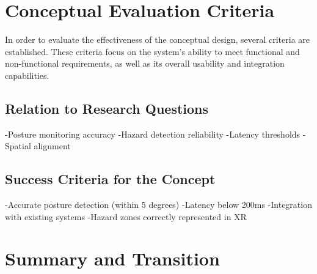 \section{Conceptual Evaluation Criteria}
In order to evaluate the effectiveness of the conceptual design, several criteria are established. These criteria focus on the system's ability to meet functional and non-functional requirements, as well as its overall usability and integration capabilities.
\subsection{Relation to Research Questions}

-Posture monitoring accuracy
-Hazard detection reliability
-Latency thresholds
-Spatial alignment 

\subsection{Success Criteria for the Concept}
-Accurate posture detection (within 5 degrees)
-Latency below 200ms
-Integration with existing systems
-Hazard zones correctly represented in XR

\section{Summary and Transition}
